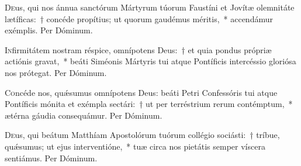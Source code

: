 \documentclass[vesperale_romanum.tex]{subfiles}
\begin{document}
\lettrine{D}{e}us, qui nos ánnua san\-ctórum Mártyrum túorum Faustíni et Jovítæ ole\-mnitáte lætíficas:~† concéde propítius; ut quorum gaudémus méritis,~* accendámur exémplis. Per Dóminum.

\myrule


\oratio

\lettrine{I}{n}firmitátem nostram réspice, omnípotens Deus:~† et quia pondus própriæ actiónis gravat,~* beáti Siméonis Mártyris tui atque Pontíficis intercéssio gloriósa nos prótegat. Per Dóminum.

\myrule


\duplexmajus



\myrule


\duplexmtv


\oratio

\lettrine{C}{o}ncéde nos, quǽsumus omnípotens Deus: beáti Petri Confessóris tui atque Pontíficis mónita et exémpla se\-ctári:~† ut per terréstrium rerum contémptum,~* ætérna gáudia consequámur. Per Dóminum.

\quadcommferiae

\myrule






\oratio

\lettrine{D}{e}us, qui beátum Matthíam Apostolórum tuórum collégio sociásti:~† tríbue, quǽsumus; ut ejus interventióne,~* tuæ circa nos pietátis semper víscera sentiámus.
Per Dóminum.
\end{document}
